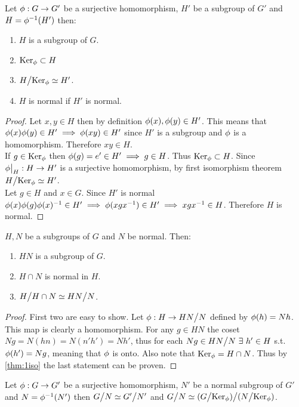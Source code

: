 \begin{theorem}\label{thm:cor}
  Let $\phi:G\to G'$ be a surjective homomorphism, $H'$ be a subgroup of $G'$ and $H = \phi^{-1}(H')$ then:
  \begin{enumerate}
    \item $H$ is a subgroup of $G$.
    \item $\text{Ker}_\phi\subset H$
    \item $H\bign/\Ker_\p\simeq H'$.
    \item $H$ is normal if $H'$ is normal.
  \end{enumerate}
\end{theorem}
\begin{proof}
  Let $x,y\in H$ then by definition $\phi(x), \phi(y)\in H'$. This means that $\phi(x)\phi(y) \in H' \implies \phi(xy) \in H'$ since $H'$ is a subgroup and $\phi$ is a homomorphism. Therefore $xy\in H$.\\

  If $g\in \text{Ker}_\phi$ then $\phi(g) = e' \in H' \implies g\in H$. Thus $\text{Ker}_\phi\subset H$. Since $\phi\big|_H: H\to H'$ is a surjective homomorphism, by first isomorphism theorem $H\bign/\Ker_\p \simeq H'$.\\

  Let $g\in H$ and $x\in G$. Since $H'$ is normal $\phi(x)\phi(g)\phi(x)^{-1} \in H' \implies \phi(xgx^{-1})\in H' \implies xgx^{-1}\in H$. Therefore $H$ is normal.
\end{proof}
\begin{theorem}\label{thm:2iso}
  $H,N$ be a subgroups of $G$ and $N$ be normal. Then:
  \begin{enumerate}
    \item $HN$ is a subgroup of $G$.
    \item $H\cap N$ is normal in $H$.
    \item $H\bign/ H\cap N \simeq HN\bign/N$.
  \end{enumerate}
\end{theorem}
\begin{proof}
  First two are easy to show. Let $\p: H\to HN\bign/N$ defined by $\phi(h) = Nh$. This map is clearly a homomorphism. For any $g\in HN$ the coset $Ng = N(hn) = N(n'h') = Nh'$, thus for each $Ng\in HN\bign/ N\ \exists\ h'\in H$ s.t. $\phi(h') = Ng$, meaning that $\phi$ is onto. Also note that $\text{Ker}_\phi = H\cap N$. Thus by \cref{thm:1iso} the last statement can be proven.
\end{proof}
\begin{theorem}\label{thm:3iso}
  Let $\phi:G\to G'$ be a surjective homomorphism, $N'$ be a normal subgroup of $G'$ and $N = \phi^{-1}(N')$ then $G\bign/N \simeq G'\bign/N'$ and $G\bign/N \simeq (G\bign/\Ker_\p)\bign/(N\bign/ \Ker_\p)$.
\end{theorem}
